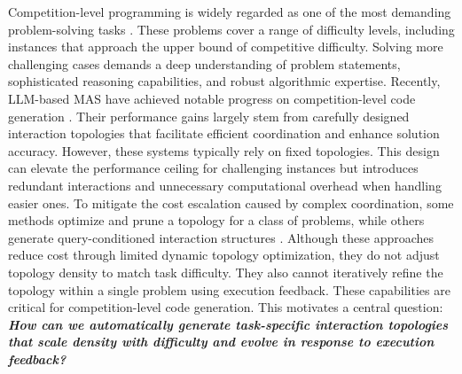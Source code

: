 \documentclass{article}
\theoremstyle{definition}
\begin{document}
Competition-level programming is widely regarded as one of the most demanding problem-solving tasks \citep{khan2023xcodeeval, hendrycks2021measuring}. These problems cover a range of difficulty levels, including instances that approach the upper bound of competitive difficulty. Solving more challenging cases demands a deep understanding of problem statements, sophisticated reasoning capabilities, and robust algorithmic expertise. 
Recently, LLM-based MAS have achieved notable progress on competition-level code generation \citep{islam2024mapcoder, islam2025codesim}. Their performance gains largely stem from carefully designed interaction topologies that facilitate efficient coordination and enhance solution accuracy. However, these systems typically rely on fixed topologies. This design can elevate the performance ceiling for challenging instances but introduces redundant interactions and unnecessary computational overhead when handling easier ones. To mitigate the cost escalation caused by complex coordination, some methods \citep{zhang2024cut, wang2025agentdropout} optimize and prune a topology for a class of problems, while others generate query-conditioned interaction structures \citep{zhang2024g}. Although these approaches reduce cost through limited dynamic topology optimization, they do not adjust topology density to match task difficulty. They also cannot iteratively refine the topology within a single problem using execution feedback. These capabilities are critical for competition-level code generation.
This motivates a central question: \textbf{\textit{How can we automatically generate task-specific interaction topologies that scale density with difficulty and evolve in response to execution feedback?}}
\end{document}
